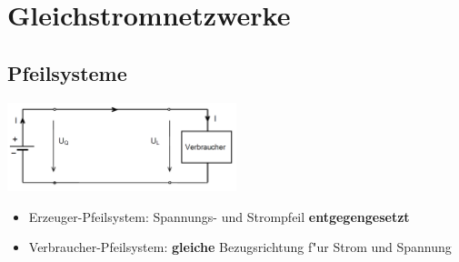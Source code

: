 \section{Gleichstromnetzwerke}

\subsection{Pfeilsysteme}
\begin{multicols}{2}
\includegraphics[width=0.50\textwidth]{pics/dcnet/pfeilsysteme}\\
\begin{itemize}
	\item Erzeuger-Pfeilsystem: Spannungs- und Strompfeil \textbf{entgegengesetzt}\\
	\item Verbraucher-Pfeilsystem: \textbf{gleiche} Bezugsrichtung f"ur Strom und Spannung\\
\end{itemize}
\end{multicols}
